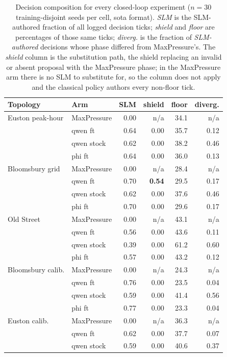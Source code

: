 \begin{table}[t]
\centering
\small
\begin{tabular}{llrrrr}
\toprule
Topology & Arm & SLM & shield & floor & diverg. \\
\midrule
Euston peak-hour & MaxPressure & 0.00 & n/a & 34.1 & n/a \\
 & qwen ft & 0.64 & 0.00 & 35.7 & 0.12 \\
 & qwen stock & 0.62 & 0.00 & 38.2 & 0.46 \\
 & phi ft & 0.64 & 0.00 & 36.0 & 0.13 \\
\midrule
Bloomsbury grid & MaxPressure & 0.00 & n/a & 28.4 & n/a \\
 & qwen ft & 0.70 & \textbf{0.54} & 29.5 & 0.17 \\
 & qwen stock & 0.62 & 0.00 & 37.6 & 0.46 \\
 & phi ft & 0.70 & 0.00 & 29.6 & 0.17 \\
\midrule
Old Street & MaxPressure & 0.00 & n/a & 43.1 & n/a \\
 & qwen ft & 0.56 & 0.00 & 43.6 & 0.11 \\
 & qwen stock & 0.39 & 0.00 & 61.2 & 0.60 \\
 & phi ft & 0.57 & 0.00 & 43.2 & 0.12 \\
\midrule
Bloomsbury calib. & MaxPressure & 0.00 & n/a & 24.3 & n/a \\
 & qwen ft & 0.76 & 0.00 & 23.5 & 0.04 \\
 & qwen stock & 0.59 & 0.00 & 41.4 & 0.56 \\
 & phi ft & 0.77 & 0.00 & 23.3 & 0.04 \\
\midrule
Euston calib. & MaxPressure & 0.00 & n/a & 36.3 & n/a \\
 & qwen ft & 0.62 & 0.00 & 37.7 & 0.07 \\
 & qwen stock & 0.59 & 0.00 & 40.6 & 0.37 \\
\bottomrule
\end{tabular}
\caption{Decision composition for every closed-loop experiment ($n{=}30$
training-disjoint seeds per cell, sota format). \emph{SLM} is the
SLM-authored fraction of all logged decision ticks; \emph{shield} and
\emph{floor} are percentages of those same ticks; \emph{diverg.} is the
fraction of \emph{SLM-authored} decisions whose phase differed from
MaxPressure's. The \emph{shield} column is the substitution path, the
shield replacing an
invalid or absent proposal with the MaxPressure phase; in the MaxPressure
arm there is no SLM to substitute for, so the column does not apply and
the classical policy authors every non-floor tick.}
\label{tab:composition}
\end{table}

